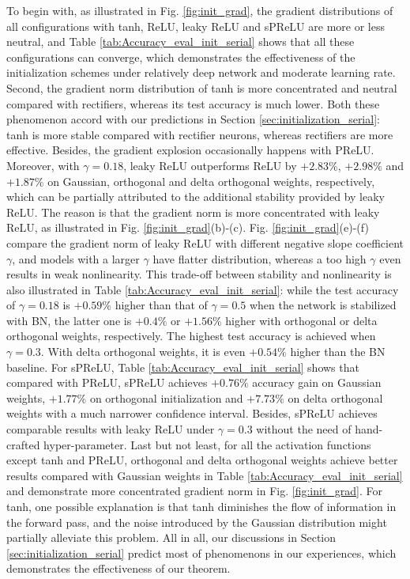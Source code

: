 \documentclass[10pt,journal,compsoc]{IEEEtran}
\begin{document}
To begin with, as illustrated in Fig. \ref{fig:init_grad}, the gradient distributions of all configurations with tanh, ReLU, leaky ReLU and sPReLU are more or less neutral, and Table \ref{tab:Accuracy_eval_init_serial} shows that all these configurations can converge, which demonstrates the effectiveness of the initialization schemes under relatively deep network and moderate learning rate. Second, the gradient norm distribution of tanh is more concentrated and neutral compared with rectifiers, whereas its test accuracy is much lower. Both these phenomenon accord with our predictions in Section \ref{sec:initialization_serial}: tanh is more stable compared with rectifier neurons, whereas rectifiers are more effective. Besides, the gradient explosion occasionally happens with PReLU. Moreover, with $\gamma=0.18$, leaky ReLU outperforms ReLU by $+2.83\%$, $+2.98\%$ and $+1.87\%$ on Gaussian, orthogonal and delta orthogonal weights, respectively, which can be partially attributed to the additional stability provided by leaky ReLU. The reason is that the gradient norm is more concentrated with leaky ReLU, as illustrated in Fig. \ref{fig:init_grad}(b)-(c). Fig. \ref{fig:init_grad}(e)-(f) compare the gradient norm of leaky ReLU with different negative slope coefficient $\gamma$, and models with a larger $\gamma$ have flatter distribution, whereas a too high $\gamma$ even results in weak nonlinearity. This trade-off between stability and nonlinearity is also illustrated in Table \ref{tab:Accuracy_eval_init_serial}: while the test accuracy of $\gamma=0.18$ is $+0.59\%$ higher than that of $\gamma=0.5$ when the network is stabilized with BN, the latter one is $+0.4\%$ or $+1.56\%$ higher with orthogonal or delta orthogonal weights, respectively. The highest test accuracy is achieved when $\gamma=0.3$. With delta orthogonal weights, it is even $+0.54\%$ higher than the BN baseline. For sPReLU, Table \ref{tab:Accuracy_eval_init_serial} shows that compared with PReLU, sPReLU achieves $+0.76\%$ accuracy gain on Gaussian weights, $+1.77\%$ on orthogonal initialization and $+7.73\%$ on delta orthogonal weights with a much narrower confidence interval. Besides, sPReLU achieves comparable results with leaky ReLU under $\gamma=0.3$ without the need of hand-crafted hyper-parameter. Last but not least, for all the activation functions except tanh and PReLU, orthogonal and delta orthogonal weights achieve better results compared with Gaussian weights in Table \ref{tab:Accuracy_eval_init_serial} and demonstrate more concentrated gradient norm in Fig. \ref{fig:init_grad}. For tanh, one possible explanation is that tanh diminishes the flow of information in the forward pass, and the noise introduced by the Gaussian distribution might partially alleviate this problem. All in all, our discussions in Section \ref{sec:initialization_serial} predict most of phenomenons in our experiences, which demonstrates the effectiveness of our theorem.
\end{document}
